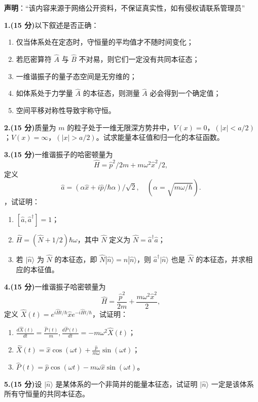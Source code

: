 
\textbf{声明}：“该内容来源于网络公开资料，不保证真实性，如有侵权请联系管理员”

\textbf{1.(15 分)}以下叙述是否正确：

\begin{enumerate}
    \item  仅当体系处在定态时，守恒量的平均值才不随时间变化；
    \item  若厄密算符 $\hat{A}$ 与 $\hat{B}$ 不对易，则它们一定没有共同本征态；
    \item  一维谐振子的量子态空间是无穷维的；
    \item  如体系处于力学量 $\hat{A}$ 的本征态，则测量 $\hat{A}$ 必会得到一个确定值；
    \item  空间平移对称性导致宇称守恒。
\end{enumerate}

\textbf{2.(15 分)}质量为 $m$ 的粒子处于一维无限深方势井中，$V(x) = 0$，$(|x| < a/2)$；$V(x) = \infty$，$(|x| > a/2)$。试求能量本征值和归一化的本征函数。

\textbf{3.(15 分)}一维谐振子的哈密顿量为 
$$\hat{H} = \hat{p}^2/2m + m\omega^2 \hat{x}^2/2,~$$ 
定义
$$\hat{a} = (\alpha \hat{x} + i \hat{p}/\hbar\alpha)/\sqrt{2}, \quad (\alpha = \sqrt{m \omega / \hbar}).~$$，试证明：
\begin{enumerate}
    \item  $[\hat{a}, \hat{a}^\dagger] = 1$；
    \item  $\hat{H} = (\hat{N} + 1/2)\hbar \omega$，其中 $\hat{N}$ 定义为 $\hat{N} = \hat{a}^\dagger \hat{a}$；
    \item  若 $|\hat{n}\rangle$ 为 $\hat{N}$ 的本征态，即 $\hat{N}|\hat{n}\rangle = n|\hat{n}\rangle$，则 $\hat{a}^\dagger|\hat{n}\rangle$ 也是 $\hat{N}$ 的本征态，并求相应的本征值。
\end{enumerate}

\textbf{4.(15 分)}一维谐振子哈密顿量为 
$$\hat{H} = \frac{\hat{p}^2}{2m} + \frac{m\omega^2 \hat{x}^2}{2},~$$ 
定义 $\hat{X}(t) = e^{i\hat{H}t/\hbar} \hat{x} e^{-i\hat{H}t/\hbar}$，试证明：
\begin{enumerate}
    \item  $\frac{d\hat{X}(t)}{dt} = \frac{\hat{P}(t)}{m}, \frac{d\hat{P}(t)}{dt} = -m\omega^2 \hat{X}(t)$；
    \item  $\hat{X}(t) = \hat{x} \cos(\omega t) + \frac{\hat{p}}{m\omega} \sin(\omega t)$；
    \item  $\hat{P}(t) = \hat{p} \cos(\omega t) - m\omega \hat{x} \sin(\omega t)$。
\end{enumerate}

\textbf{5.(15 分)}设 $|\hat{n}\rangle$ 是某体系的一个非简并的能量本征态，试证明 $|\hat{n}\rangle$ 一定是该体系所有守恒量的共同本征态。